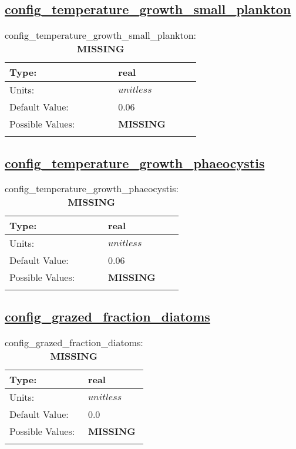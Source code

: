 \subsection[config\_temperature\_growth\_small\_plankton]{\hyperref[sec:nm_tab_biogeochemistry]{config\_temperature\_growth\_small\_plankton}}
\label{subsec:nm_sec_config_temperature_growth_small_plankton}
\begin{center}
\begin{longtable}{| p{2.0in} || p{4.0in} |}
    \hline
    Type: & real \\
    \hline
    Units: & $unitless$ \\
    \hline
    Default Value: & 0.06 \\
    \hline
    Possible Values: & {\bf \color{red} MISSING} \\
    \hline
    \caption{config\_temperature\_growth\_small\_plankton: {\bf \color{red} MISSING}}
\end{longtable}
\end{center}
\subsection[config\_temperature\_growth\_phaeocystis]{\hyperref[sec:nm_tab_biogeochemistry]{config\_temperature\_growth\_phaeocystis}}
\label{subsec:nm_sec_config_temperature_growth_phaeocystis}
\begin{center}
\begin{longtable}{| p{2.0in} || p{4.0in} |}
    \hline
    Type: & real \\
    \hline
    Units: & $unitless$ \\
    \hline
    Default Value: & 0.06 \\
    \hline
    Possible Values: & {\bf \color{red} MISSING} \\
    \hline
    \caption{config\_temperature\_growth\_phaeocystis: {\bf \color{red} MISSING}}
\end{longtable}
\end{center}
\subsection[config\_grazed\_fraction\_diatoms]{\hyperref[sec:nm_tab_biogeochemistry]{config\_grazed\_fraction\_diatoms}}
\label{subsec:nm_sec_config_grazed_fraction_diatoms}
\begin{center}
\begin{longtable}{| p{2.0in} || p{4.0in} |}
    \hline
    Type: & real \\
    \hline
    Units: & $unitless$ \\
    \hline
    Default Value: & 0.0 \\
    \hline
    Possible Values: & {\bf \color{red} MISSING} \\
    \hline
    \caption{config\_grazed\_fraction\_diatoms: {\bf \color{red} MISSING}}
\end{longtable}
\end{center}
